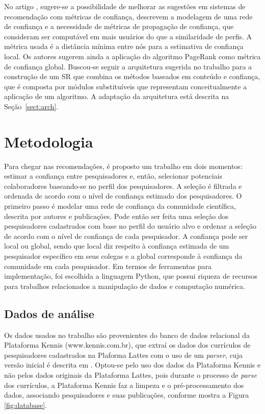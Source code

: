 \documentclass[12pt]{article}
\begin{document}
No artigo \cite{massa2004trust}, sugere-se a possibilidade de melhorar as sugestões em sistemas de recomendação com métricas de confiança, descrevem a modelagem de uma rede de confiança e a necessidade de métricas de propagação de confiança, que consideram ser computável em mais usuários do que a similaridade de perfis. A métrica usada é a distância mínima entre nós para a estimativa de confiança local. Os autores sugerem ainda a aplicação do algoritmo PageRank \cite{page1999pagerank} como métrica de confiança global. Buscou-se seguir a arquitetura sugerida no trabalho para a construção de um SR que combina os métodos baseados em conteúdo e confiança, que é composta por módulos substituíveis que representam conceitualmente a aplicação de um algoritmo. A adaptação da arquitetura está descrita na Seção~\ref{sect:arch}.

\section{Metodologia}

Para chegar nas recomendações, é proposto um trabalho em dois momentos: estimar a confiança entre pesquisadores e, então, selecionar potenciais colaboradores baseando-se no perfil dos pesquisadores. A seleção é filtrada e ordenada de acordo com o nível de confiança estimado dos pesquisadores. O primeiro passo é modelar uma rede de confiança da comunidade científica, descrita por autores e publicações. Pode então ser feita uma seleção dos pesquisadores cadastrados com base no perfil do usuário alvo e ordenar a seleção de acordo com o nível de confiança de cada pesquisador. A confiança pode ser local ou global, sendo que local diz respeito à confiança estimada de um pesquisador específico em seus colegas e a global corresponde à confiança da comunidade em cada pesquisador. Em termos de ferramentas para implementação, foi escolhida a linguagem Python, que possui riqueza de recursos para trabalhos relacionados a manipulação de dados e computação numérica.%

\subsection{Dados de análise}

Os dados usados no trabalho são provenientes do banco de dados relacional da Plataforma Kennis (www.kennis.com.br), que extraí os dados dos currículos de pesquisadores cadastrados na Plaforma Lattes com o uso de um \textit{parser}, cuja versão inicial é descrita em \cite{prass2019parser}. Optou-se pelo uso dos dados da Plataforma Kennis e não pelos dados originais da Plataforma Lattes, pois durante o processo de \textit{parse} dos currículos, a Plataforma Kennis faz a limpeza e o pré-processamento dos dados, associando pesquisadores e suas publicações, conforme mostra a Figura \ref{fig:database}.
\end{document}
